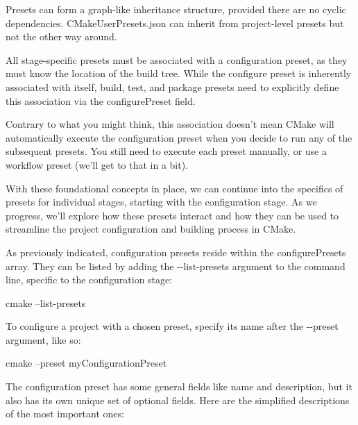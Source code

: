Presets can form a graph-like inheritance structure, provided there are no cyclic dependencies. CMakeUserPresets.json can inherit from project-level presets but not the other way around.


All stage-specific presets must be associated with a configuration preset, as they must know the location of the build tree. While the configure preset is inherently associated with itself, build, test, and package presets need to explicitly define this association via the configurePreset field.

Contrary to what you might think, this association doesn’t mean CMake will automatically execute the configuration preset when you decide to run any of the subsequent presets. You still need to execute each preset manually, or use a workflow preset (we’ll get to that in a bit).

With these foundational concepts in place, we can continue into the specifics of presets for individual stages, starting with the configuration stage. As we progress, we’ll explore how these presets interact and how they can be used to streamline the project configuration and building process in CMake.


As previously indicated, configuration presets reside within the configurePresets array. They can be listed by adding the -{}-list-presets argument to the command line, specific to the configuration stage:

\begin{shell}
cmake --list-presets
\end{shell}

To configure a project with a chosen preset, specify its name after the -{}-preset argument, like so:

\begin{shell}
cmake --preset myConfigurationPreset
\end{shell}

The configuration preset has some general fields like name and description, but it also has its own unique set of optional fields. Here are the simplified descriptions of the most important ones:

